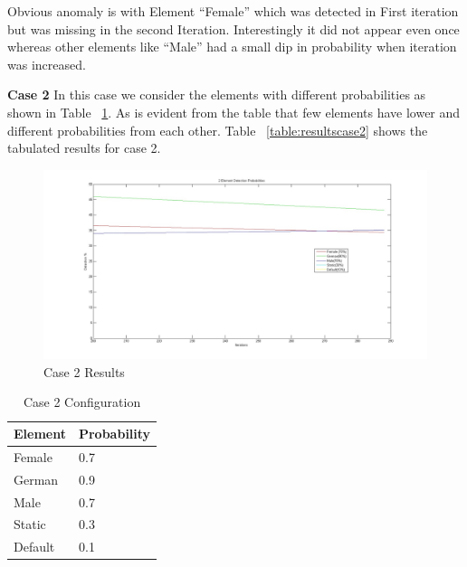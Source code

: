 \documentclass[fleqn,12pt]{SelfArx} %
\begin{document}
Obvious anomaly is with Element “Female” which was detected in First iteration but was missing in the second Iteration. Interestingly it did not appear even once whereas other elements like “Male” had a small dip in probability when iteration was increased.
\par \textbf {Case 2} In this case we consider the elements with different probabilities as shown in Table ~\ref{table:case2}. As is evident from the table that few elements have lower and different probabilities from each other. Table ~\ref{table:resultscase2} shows the tabulated results for case 2.
\begin{figure}[h!]
	\includegraphics[width=\linewidth]{case2.jpg}
    \caption{Case 2 Results}
    \label{fig:case2results}
\end{figure}
\begin{table}[h!]
	\begin{center}
    \begin{tabular}{| l | l |}
    \hline
    Element & Probability \\ \hline
    Female & 0.7\\ \hline
    German & 0.9\\ \hline
    Male & 0.7\\ \hline
    Static & 0.3\\ \hline
    Default & 0.1\\ \hline
    \hline
    \end{tabular}
    \caption{Case 2 Configuration}
	\label{table:case2}
    \end{center}
\end{table}
\end{document}

